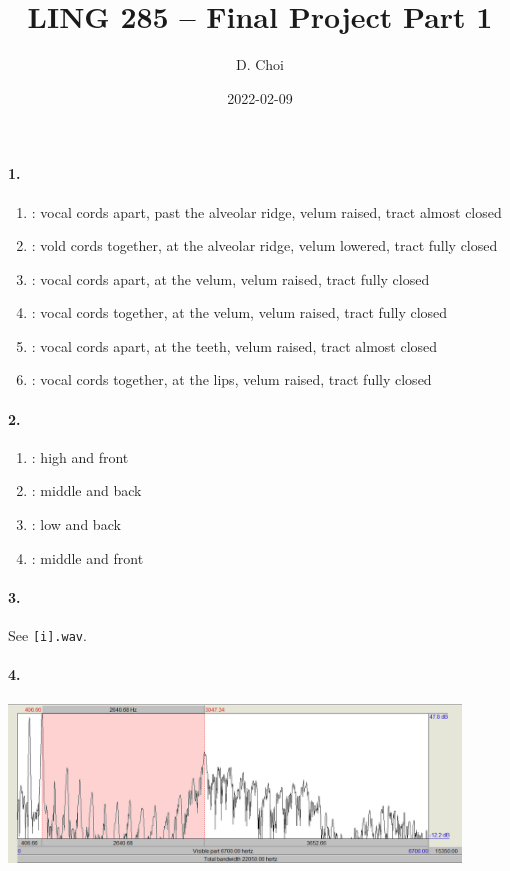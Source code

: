 \documentclass[12pt]{article}
\title{LING 285 -- Final Project Part 1}
\author{D. Choi}
\date{2022-02-09}
\begin{document}
\maketitle

\paragraph{1.}
\begin{enumerate}[label=\textbf{\alph*.}]
    \item \textbf{\textipa{[\textesh]}}:
    vocal cords apart, past the alveolar ridge, velum raised, tract almost closed
    \item \textbf{\textipa{[n]}}:
    vold cords together, at the alveolar ridge, velum lowered, tract fully closed
    \item \textbf{\textipa{[k]}}:
    vocal cords apart, at the velum, velum raised, tract fully closed
    \item \textbf{\textipa{[g]}}:
    vocal cords together, at the velum, velum raised, tract fully closed
    \item \textbf{\textipa{[\texttheta]}}:
    vocal cords apart, at the teeth, velum raised, tract almost closed
    \item \textbf{\textipa{[b]}}:
    vocal cords together, at the lips, velum raised, tract fully closed
\end{enumerate}

\paragraph{2.}
\begin{enumerate}[label=\textbf{\alph*.}]
    \item \textbf{\textipa{[\textsci]}}: high and front
    \item \textbf{\textipa{[o]}}: middle and back
    \item \textbf{\textipa{[\textscripta]}}: low and back
    \item \textbf{\textipa{[e]}}: middle and front
\end{enumerate}

\paragraph{3.}
See \texttt{[i].wav}.

\paragraph{4.}
\includegraphics[width=0.9\textwidth]{[i]-spectrum.png}
\end{document}
